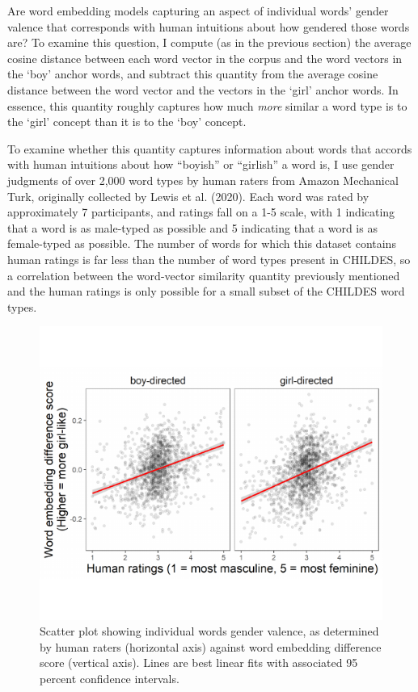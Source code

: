 \documentclass[10pt, letterpaper]{article}
\newenvironment{CodeChunk}{}{}
\begin{document}
Are word embedding models capturing an aspect of individual words'
gender valence that corresponds with human intuitions about how gendered
those words are? To examine this question, I compute (as in the previous
section) the average cosine distance between each word vector in the
corpus and the word vectors in the `boy' anchor words, and subtract this
quantity from the average cosine distance between the word vector and
the vectors in the `girl' anchor words. In essence, this quantity
roughly captures how much \emph{more} similar a word type is to the
`girl' concept than it is to the `boy' concept.

To examine whether this quantity captures information about words that
accords with human intuitions about how ``boyish'' or ``girlish'' a word
is, I use gender judgments of over 2,000 word types by human raters from
Amazon Mechanical Turk, originally collected by Lewis et al. (2020).
Each word was rated by approximately 7 participants, and ratings fall on
a 1-5 scale, with 1 indicating that a word is as male-typed as possible
and 5 indicating that a word is as female-typed as possible. The number
of words for which this dataset contains human ratings is far less than
the number of word types present in CHILDES, so a correlation between
the word-vector similarity quantity previously mentioned and the human
ratings is only possible for a small subset of the CHILDES word types.

\begin{CodeChunk}
\begin{figure}[h]

{\centering \includegraphics{figs/human_plot-1} 

}

\caption[Scatter plot showing individual words gender valence, as determined by human raters (horizontal axis) against word embedding difference score (vertical axis)]{Scatter plot showing individual words gender valence, as determined by human raters (horizontal axis) against word embedding difference score (vertical axis). Lines are best linear fits with associated 95 percent confidence intervals.}\label{fig:human_plot}
\end{figure}
\end{CodeChunk}
\end{document}
